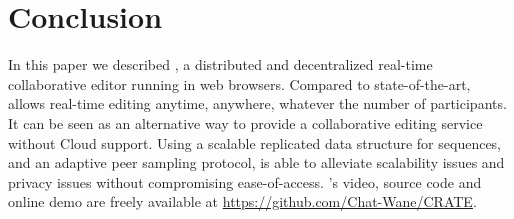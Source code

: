 
\section{Conclusion}
\label{sec:conclusion}

In this paper we described \CRATE, a distributed and decentralized
real-time collaborative editor running in web browsers. Compared to
state-of-the-art, \CRATE allows real-time editing anytime, anywhere,
whatever the number of participants. It can be seen as an alternative way
to provide a collaborative editing service without Cloud support. Using
a scalable replicated data structure for sequences, and an adaptive
peer sampling protocol, \CRATE is able to alleviate scalability issues
and privacy issues without compromising ease-of-access. \CRATE's video,
source code and online demo are freely available at
\url{https://github.com/Chat-Wane/CRATE}.

